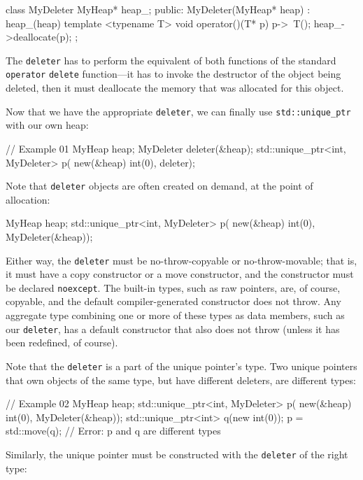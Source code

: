 \begin{code}
class MyDeleter {
  MyHeap* heap_;
  public:
  MyDeleter(MyHeap* heap) : heap_(heap) {}
  template <typename T> void operator()(T* p) {
    p->~T();
    heap_->deallocate(p);
  }
};
\end{code}

The \texttt{deleter} has to perform the equivalent of both functions of the standard \texttt{operator} \texttt{delete} function---it has to invoke the destructor of the object being deleted, then it must deallocate the memory that was allocated for this object.

Now that we have the appropriate \texttt{deleter}, we can finally use \texttt{std::unique\_ptr} with our own heap:

\begin{code}
// Example 01
MyHeap heap;
MyDeleter deleter(&heap);
std::unique_ptr<int, MyDeleter> p(
  new(&heap) int(0), deleter);
\end{code}

Note that \texttt{deleter} objects are often created on demand, at the point of allocation:

\begin{code}
MyHeap heap;
std::unique_ptr<int, MyDeleter> p(
  new(&heap) int(0), MyDeleter(&heap));
\end{code}

Either way, the \texttt{deleter} must be no-throw-copyable or no-throw-movable; that is, it must have a copy constructor or a move constructor, and the constructor must be declared \texttt{noexcept}. The built-in types, such as raw pointers, are, of course, copyable, and the default compiler-generated constructor does not throw. Any aggregate type combining one or more of these types as data members, such as our \texttt{deleter}, has a default constructor that also does not throw (unless it has been redefined, of course).

Note that the \texttt{deleter} is a part of the unique pointer's type. Two unique pointers that own objects of the same type, but have different deleters, are different types:

\begin{code}
// Example 02
MyHeap heap;
std::unique_ptr<int, MyDeleter> p(
  new(&heap) int(0), MyDeleter(&heap));
std::unique_ptr<int> q(new int(0));
p = std::move(q);    // Error: p and q are different types
\end{code}

Similarly, the unique pointer must be constructed with the \texttt{deleter} of the right type:

